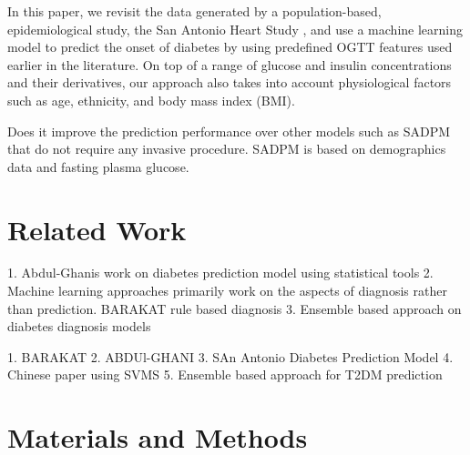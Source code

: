 \documentclass[journal,comsoc]{IEEEtran}
\begin{document}
In this paper, we revisit the data generated by a population-based, epidemiological study, the San Antonio Heart Study \cite{burke_rapid_1999, lorenzo_trend_2006}, and use a machine learning model to predict the onset of diabetes by using predefined OGTT features used earlier in the literature. On top of a range of glucose and insulin concentrations and their derivatives, our approach also takes into account physiological factors such as age, ethnicity, and body mass index (BMI).
%

Does it improve the prediction performance over other models such as SADPM that do not require any invasive procedure. SADPM is based on demographics data and fasting plasma glucose.





\section{Related Work}

1. Abdul-Ghanis work on diabetes prediction model using statistical tools
2. Machine learning approaches primarily work on the aspects of diagnosis rather than prediction.
BARAKAT rule based diagnosis
3. Ensemble based approach on diabetes diagnosis models

1. BARAKAT
2. ABDUl-GHANI
3. SAn Antonio Diabetes Prediction Model
4. Chinese paper using SVMS
5. Ensemble based approach for T2DM prediction

\section{Materials and Methods}
%
\end{document}
